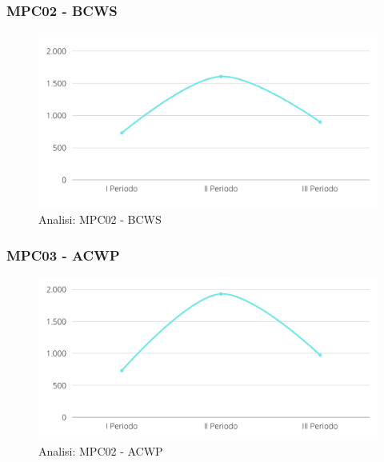 \subsubsection{MPC02 - BCWS}
\begin{figure}[H]
    \centering
    \includegraphics[scale=0.50]{Sezioni/images/analisi-bcws.png}
    \caption{Analisi: MPC02 - BCWS}
\end{figure}

\subsubsection{MPC03 - ACWP}
\begin{figure}[H]
    \centering
    \includegraphics[scale=0.50]{Sezioni/images/analisi-acwp.png}
    \caption{Analisi: MPC02 - ACWP}
\end{figure}

